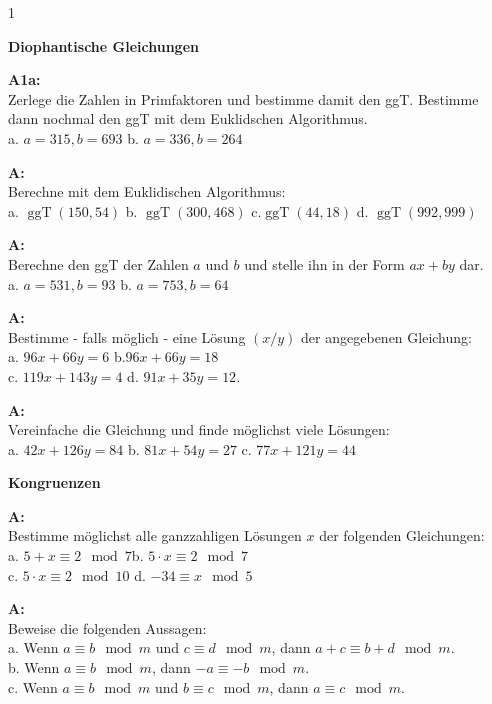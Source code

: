 \documentclass[landscape,twocolumn,a4paper]{article}
\begin{document}
\newcommand{\ggT}{\operatorname{ggT}}
\newcommand{\Mod}[3]{#1\equiv#2\mod#3}
\newcommand\x{1}
\setcounter {y} {1}

\parindent 0mm



\textbf{Diophantische Gleichungen} 
\bigskip

\textbf{A1a:}   \\
Zerlege die Zahlen in Primfaktoren und bestimme damit den ggT. Bestimme dann nochmal den ggT mit
dem Euklidschen Algorithmus. \\
a.  $a = 315, b=693$ \quad b. $a=336,b=264$
\bigskip  

\textbf{A:}   \\
Berechne mit dem Euklidischen Algorithmus: \\
a.  $\ggT(150,54)$ \quad b. $\ggT(300,468)$ \quad 
 c.$\ggT(44,18)$ \quad d. $\ggT(992,999)$
\bigskip {}
 
\textbf{A:}   \\
Berechne den ggT der Zahlen $a$ und $b$ und stelle ihn in der Form $ax + by$ dar. \\
a.   $ a = 531, b = 93$  \quad b. $ a = 753, b = 64$
\bigskip {}

\textbf{A:}   \\
Bestimme - falls möglich - eine Lösung $(x/y)$ der angegebenen Gleichung: \\
a.  $96x+66y=6$ \quad b.$96x+66y=18$ \\
c.  $119x+143y=4$ \quad d. $91x+35y=12$.
\bigskip {}
 
 
 \textbf{A:}   \\
Vereinfache die Gleichung und finde möglichst viele Lösungen: \\
a.   $42x+126y=84$ \quad b. $81x+54y=27$ \quad 
 c. $77x+121y=44$ 
 \bigskip {}

 
 \textbf{Kongruenzen} \bigskip
 
\textbf{A:}   \\
Bestimme möglichst alle ganzzahligen Lösungen $x$ der folgenden
  Gleichungen: \\
a. $\Mod{5+x}{2}{7}$\quad b.   $\Mod{5\cdot x}{2}{7}$ \\ 
c. $\Mod{5\cdot x}{2}{10}$  \quad d.  $\Mod{-34}{x}{5}$
\bigskip {}

\textbf{A:}   \\
Beweise die folgenden Aussagen:\\
a. Wenn $\Mod{a}{b}{m}$ und $\Mod{c}{d}{m}$, dann
    $\Mod{a+c}{b+d}{m}$. \\
b. Wenn $\Mod{a}{b}{m}$, dann $\Mod{-a}{-b}{m}$. \\
c. Wenn $\Mod{a}{b}{m}$ und $\Mod{b}{c}{m}$, dann
    $\Mod{a}{c}{m}$.
\bigskip {}
\end{document}
